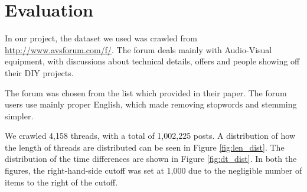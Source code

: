 \chapter{Evaluation}

In our project, the dataset we used was crawled from 
\url{http://www.avsforum.com/f/}. The forum deals mainly with Audio-Visual 
equipment, with discussions about technical details, offers and people showing 
off their DIY projects.

The forum was chosen from the list which  provided in their 
paper. The forum users use mainly proper English, which made removing stopwords 
and stemming simpler.

We crawled 4,158 threads, with a total of 1,002,225 posts. A distribution of how 
the length of threads are distributed can be seen in Figure \ref{fig:len_dist}.  
The distribution of the time differences are shown in Figure \ref{fig:dt_dist}.  
In both the figures, the right-hand-side cutoff was set at 1,000 due to the 
negligible number of items to the right of the cutoff.



